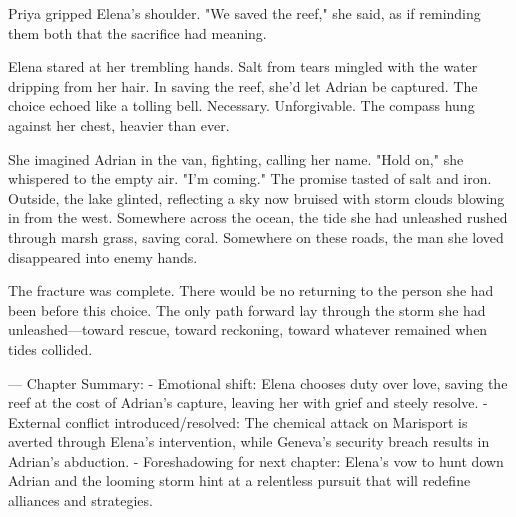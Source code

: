 Priya gripped Elena's shoulder. "We saved the reef," she said, as if reminding them both that the sacrifice had meaning.

Elena stared at her trembling hands. Salt from tears mingled with the water dripping from her hair. In saving the reef, she'd let Adrian be captured. The choice echoed like a tolling bell. Necessary. Unforgivable. The compass hung against her chest, heavier than ever.

She imagined Adrian in the van, fighting, calling her name. "Hold on," she whispered to the empty air. "I'm coming." The promise tasted of salt and iron. Outside, the lake glinted, reflecting a sky now bruised with storm clouds blowing in from the west. Somewhere across the ocean, the tide she had unleashed rushed through marsh grass, saving coral. Somewhere on these roads, the man she loved disappeared into enemy hands.

The fracture was complete. There would be no returning to the person she had been before this choice. The only path forward lay through the storm she had unleashed—toward rescue, toward reckoning, toward whatever remained when tides collided.

\bigskip

---
Chapter Summary:
- Emotional shift: Elena chooses duty over love, saving the reef at the cost of Adrian's capture, leaving her with grief and steely resolve.
- External conflict introduced/resolved: The chemical attack on Marisport is averted through Elena's intervention, while Geneva's security breach results in Adrian's abduction.
- Foreshadowing for next chapter: Elena's vow to hunt down Adrian and the looming storm hint at a relentless pursuit that will redefine alliances and strategies.
